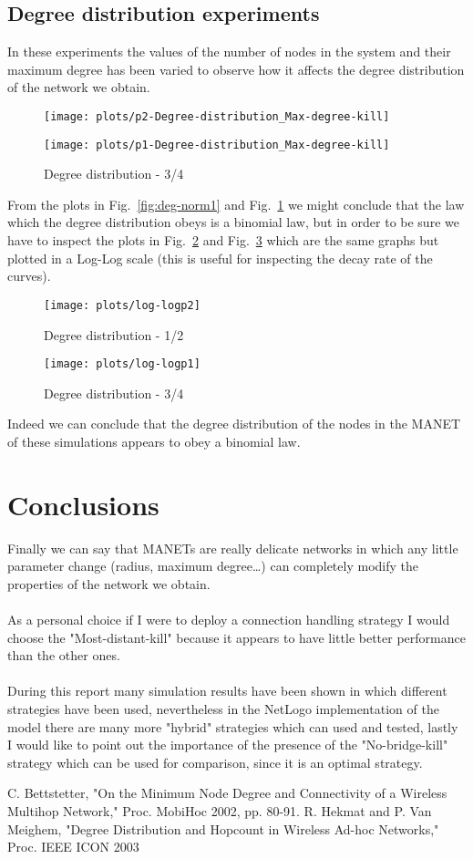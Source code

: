 \documentclass{llncs}
\begin{document}
\subsection{Degree distribution experiments}
In these experiments the values of the number of nodes in the system and their maximum degree has been varied to observe how it affects the degree distribution of the network we obtain.
\begin{figure}[H]
	\centering
	\texttt{[image: plots/p2-Degree-distribution\_Max-degree-kill]}
	\caption{Degree distribution - 1/2}
	\label{fig:deg-norm1}
	\texttt{[image: plots/p1-Degree-distribution\_Max-degree-kill]}
	\caption{Degree distribution - 3/4}
	\label{fig:deg-norm2}
\end{figure}
%
From the plots in Fig.~\ref{fig:deg-norm1} and Fig.~\ref{fig:deg-norm2} we might conclude that the law which the degree distribution obeys is a binomial law, but in order to be sure we have to inspect the plots in Fig.~\ref{fig:deg-log1} and Fig.~\ref{fig:deg-log2} which are the same graphs but plotted in a Log-Log scale (this is useful for inspecting the decay rate of the curves).
\begin{figure}[!h]
	\centering
	\texttt{[image: plots/log-logp2]}
	\caption{Degree distribution - 1/2}
	\label{fig:deg-log1}
\end{figure}
\begin{figure}[!h]
	\texttt{[image: plots/log-logp1]}
	\caption{Degree distribution - 3/4}
	\label{fig:deg-log2}
\end{figure}
Indeed we can conclude that the degree distribution of the nodes in the MANET of these simulations appears to obey a binomial law.
\section{Conclusions} 
Finally we can say that MANETs are really delicate networks in which any little parameter change (radius, maximum degree\dots) can completely modify the properties of the network we obtain.
\\\\
As a personal choice if I were to deploy a connection handling strategy I would choose the "Most-distant-kill" because it appears to have little better performance than the other ones.
\\\\
During this report many simulation results have been shown in which different strategies have been used, nevertheless in the NetLogo implementation of the model there are many more "hybrid" strategies which can used and tested, lastly I would like to point out the importance of the presence of the "No-bridge-kill" strategy which can be used for comparison, since it is an optimal strategy.
%
\begin{thebibliography}{}
	 C. Bettstetter, "On the Minimum Node Degree and Connectivity of a Wireless Multihop Network," Proc. MobiHoc 2002, pp. 80-91.
	 R. Hekmat and P. Van Meighem, "Degree Distribution and Hopcount in Wireless Ad-hoc Networks," Proc. IEEE ICON 2003
\end{thebibliography}
\end{document}
